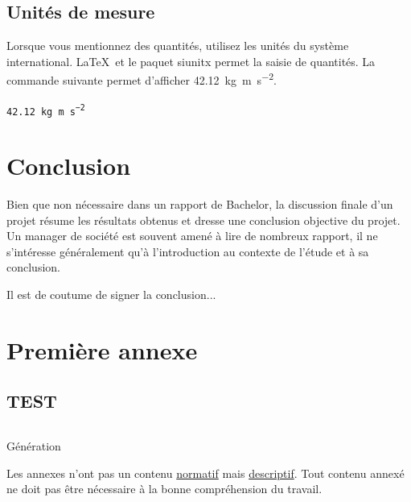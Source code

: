 \documentclass[
    iai, %
    eai, %
]{heig-tb}
\begin{document}
\section{Unités de mesure}

Lorsque vous mentionnez des quantités, utilisez les unités du système international. \LaTeX~et le paquet \textsf{siunitx} permet la saisie de quantités. La commande suivante permet d'afficher \SI{42.12}{\kilo\gram\metre\per\square\second}.\par

\texttt{\SI{42.12}{\kilo\gram\metre\per\square\second}}\par

\chapter{Conclusion}

Bien que non nécessaire dans un rapport de Bachelor, la discussion finale d'un projet résume les résultats obtenus et dresse une conclusion objective du projet. Un manager de société est souvent amené à lire de nombreux rapport, il ne s'intéresse généralement qu'à l'introduction au contexte de l'étude et à sa conclusion.

Il est de coutume de signer la conclusion...

\vfil
\hspace{8cm}\makeatletter\@author\makeatother\par
\hspace{8cm}\begin{minipage}{5cm}
  \printsignature
\end{minipage}
\clearpage

\appendix
\appendixpage
\addappheadtotoc

\chapter{Première annexe}
\section{TEST}

\begin{listing}[h]
  \inputminted[breaklines]{php}{assets/figures/php.php}
  \caption{Génération}
\end{listing}

Les annexes n'ont pas un contenu \underline{normatif} mais \underline{descriptif}. Tout contenu annexé ne doit pas être nécessaire à la bonne compréhension du travail.
\end{document}
